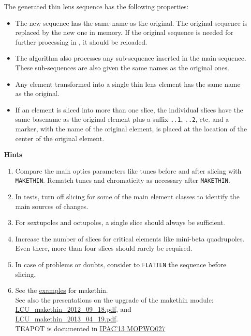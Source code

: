 The generated thin lens sequence has the following properties: 
\begin{itemize}
\item The new sequence has the same name as the original. The original sequence
  is replaced by the new one in memory. If the original sequence is
  needed for further processing in \madx, it should be reloaded.
\item The algorithm also processes any sub-sequence inserted in the main
  sequence. These sub-sequences are also given the same names as the
  original ones. 
\item Any element transformed into a single thin lens element has the
  same name as the original. 
\item If an element is sliced into more than one slice, the individual
  slices have the same basename as the original element plus a suffix 
  {\tt ..1}, {\tt ..2}, etc. and a marker, with the name of the original
  element, is placed at the location of the center of the original element.
\end{itemize}


{\bf Hints}
\begin{enumerate}
\item Compare the main optics parameters like tunes before and after slicing
  with {\tt MAKETHIN}. Rematch tunes and chromaticity as necessary after
  {\tt MAKETHIN}. 

\item In tests, turn off slicing for some of the main element classes to
  identify the main sources of changes. 

\item For sextupoles and octupoles, a single slice should always be sufficient.

\item Increase the number of slices for critical elements like mini-beta
  quadrupoles. Even there, more than four slices should rarely be
  required. 

\item In case of problems or doubts, consider to
  {\tt FLATTEN} the sequence before slicing.  

\item See the
  \href{http://madx.web.cern.ch/madx/madX/examples/makethin/}{examples}
  for makethin. \\ 
  See also the presentations on the upgrade of the makethin module:\\
  \href{http://ab-dep-abp.web.cern.ch/ab-dep-abp/LCU/LCU_meetings/2012/20120918/LCU_makethin_2012_09_18.pdf}{LCU\_makethin\_2012\_09\_18.pdf}, and \\
  \href{http://ab-dep-abp.web.cern.ch/ab-dep-abp/LCU/LCU_meetings/2013/20130419/LCU_makethin_2013_04_19.pdf}{LCU\_makethin\_2013\_04\_19.pdf}. \\ 
  TEAPOT is documented in \href{http://accelconf.web.cern.ch/AccelConf/IPAC2013/papers/mopwo027.pdf}{IPAC'13 MOPWO027}

\end{enumerate}













